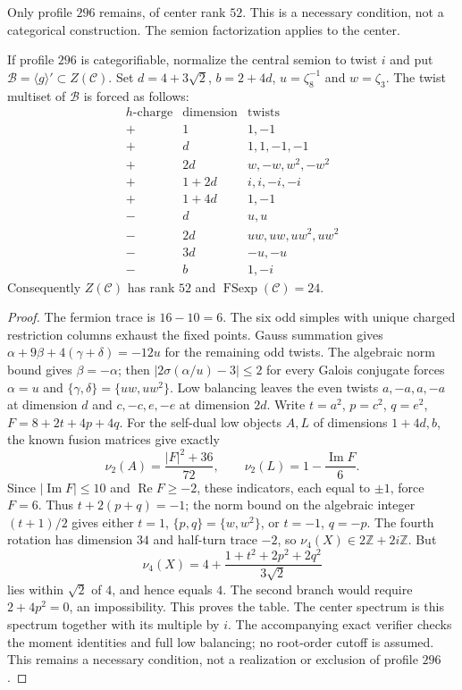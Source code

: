 Only profile $296$ remains, of center rank $52$. This is a necessary
condition, not a categorical construction. The semion factorization
applies to the center.

\begin{proposition}
If profile $296$ is categorifiable, normalize the central semion to twist
$i$ and put $\mathcal B=\langle g\rangle'\subset Z(\mathcal C)$.
Set $d=4+3\sqrt2$, $b=2+4d$, $u=\zeta_8^{-1}$ and $w=\zeta_3$.
The twist multiset of $\mathcal B$ is forced as follows:
\[
\begin{array}{c|c|l}
 h\text{-charge}&\text{dimension}&\text{twists}\\\hline
 +&1&1,-1\\
 +&d&1,1,-1,-1\\
 +&2d&w,-w,w^2,-w^2\\
 +&1+2d&i,i,-i,-i\\
 +&1+4d&1,-1\\
 -&d&u,u\\
 -&2d&uw,uw,uw^2,uw^2\\
 -&3d&-u,-u\\
 -&b&1,-i
\end{array}
\]
Consequently $Z(\mathcal C)$ has rank $52$ and
$\operatorname{FSexp}(\mathcal C)=24$.
\end{proposition}
\begin{proof}
The fermion trace is $16-10=6$. The six odd simples with unique charged
restriction columns exhaust the fixed points. Gauss summation gives
$\alpha+9\beta+4(\gamma+\delta)=-12u$ for the remaining odd twists.
The algebraic norm bound gives $\beta=-\alpha$; then
$|2\sigma(\alpha/u)-3|\le2$ for every Galois conjugate forces
$\alpha=u$ and $\{\gamma,\delta\}=\{uw,uw^2\}$.
Low balancing leaves the even twists $a,-a,a,-a$ at dimension $d$ and
$c,-c,e,-e$ at dimension $2d$.
Write $t=a^2$, $p=c^2$, $q=e^2$, $F=8+2t+4p+4q$.
For the self-dual low objects $A,L$ of dimensions $1+4d,b$, the known
fusion matrices give exactly
\[
 \nu_2(A)=\frac{|F|^2+36}{72},\qquad
 \nu_2(L)=1-\frac{\operatorname{Im}F}{6}.
\]
Since $|\operatorname{Im}F|\le10$ and $\operatorname{Re}F\ge-2$,
these indicators, each equal to $\pm1$, force $F=6$.
Thus $t+2(p+q)=-1$; the norm bound on the algebraic integer $(t+1)/2$
gives either $t=1$, $\{p,q\}=\{w,w^2\}$, or $t=-1$, $q=-p$.
The fourth rotation has dimension $34$ and half-turn trace $-2$, so
$\nu_4(X)\in2\mathbb Z+2i\mathbb Z$. But
\[
 \nu_4(X)=4+\frac{1+t^2+2p^2+2q^2}{3\sqrt2}
\]
lies within $\sqrt2$ of $4$, and hence equals $4$. The second branch
would require $2+4p^2=0$, an impossibility. This proves the table.
The center spectrum is this spectrum together with its multiple by $i$.
The accompanying exact verifier checks the moment identities and full
low balancing; no root-order cutoff is assumed. This remains a necessary
condition, not a realization or exclusion of profile $296$.
\end{proof}

